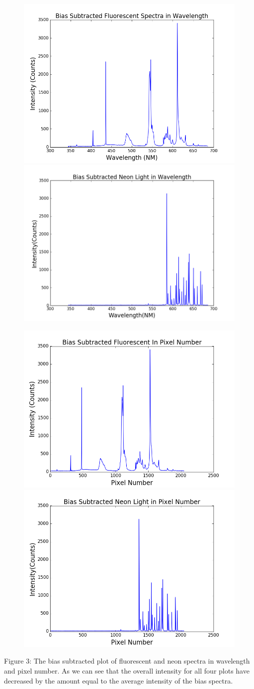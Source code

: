 \documentclass[onecolumn, 12pt, a4paper]{article}
\begin{document}
  \begin{subfigure}{\linewidth}
  \includegraphics[width=.44\linewidth]{biasfluor.png}
  \includegraphics[width=.45\linewidth]{biasneon.png}
  \end{subfigure}\par\medskip
  \begin{subfigure}{\linewidth}
  \includegraphics[width=.45\linewidth]{pbiasfluor.png}
  \includegraphics[width=.45\linewidth]{pbiasneon.png}
  \end{subfigure}\par\medskip
  \newline 
\begin{flushleft}
Figure 3: The bias subtracted plot of fluorescent and neon spectra in wavelength and pixel number. As we can see that the overall intensity for all four plots have decreased by the amount equal to the average intensity of the bias spectra.
\end{flushleft}
\newline
\end{document}
